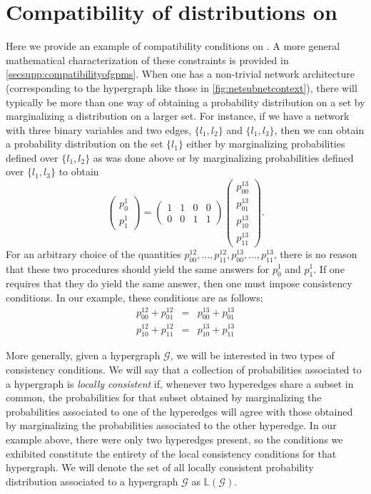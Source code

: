 \section{Compatibility of distributions on \gnpm{}}\label{sec:compatibilityofgpms}
Here we provide an example of compatibility conditions on \gnpm{}. A more general mathematical characterization of these constraints is provided in  \autoref{secsupp:compatibilityofgpms}. When one has a non-trivial network architecture (corresponding to the \SH{} hypergraph like those in \autoref{fig:netsubnetcontext}), there will typically be more
than one way of obtaining a probability distribution on a set by
marginalizing a distribution on a larger set.  For instance, if we have
a network with three binary variables and two edges, $\{l_1,l_2\}$ and
$\{l_1,l_3\}$, then we can obtain a probability distribution on the
set $\{l_1\}$ either by marginalizing probabilities defined over
$\{l_1,l_2\}$ as was done above or by marginalizing probabilities
defined over $\{l_1,l_3\}$ to obtain
\begin{equation}
 \begin{pmatrix}
  p^{1}_{0}\\
  p^{1}_{1}
 \end{pmatrix} =
 \begin{pmatrix}
  1 & 1 & 0 & 0\\
  0 & 0 & 1 & 1
 \end{pmatrix}
 \begin{pmatrix}
  p^{13}_{00}\\
  p^{13}_{01}\\
  p^{13}_{10}\\
  p^{13}_{11}
 \end{pmatrix}.
\end{equation}
For an arbitrary choice of the quantities $p^{12}_{00}, \ldots,
p^{12}_{11}, p^{13}_{00}, \ldots, p^{13}_{11}$, there is no reason
that these two procedures should yield the same answers for $p^1_0$
and $p^1_1$.  If one requires that they do yield the same answer, then
one must impose consistency conditions.   In our example, these
conditions are as follows:
\begin{eqnarray}
 p^{12}_{00} + p^{12}_{01} &=&
  p^{13}_{00} + p^{13}_{01}\\
 p^{12}_{10} + p^{12}_{11} &=&
  p^{13}_{10} + p^{13}_{11}
\end{eqnarray}

More generally, given a hypergraph $\mathcal{G}$, we will be
interested in two types of consistency conditions.  We will say that a
collection of probabilities associated to a hypergraph is
\emph{locally consistent} if, whenever two hyperedges share a subset in
common, the probabilities for that subset obtained by marginalizing
the probabilities associated to one of the hyperedges will agree with
those obtained by marginalizing the probabilities associated to the
other hyperedge.  In our example above, there were only two hyperedges
present, so the conditions we exhibited constitute the entirety of the
local consistency conditions for that hypergraph.  We will denote the
set of all locally consistent probability distribution associated to a
hypergraph $\mathcal{G}$ as $\mathbb{L}(\mathcal{G})$.

